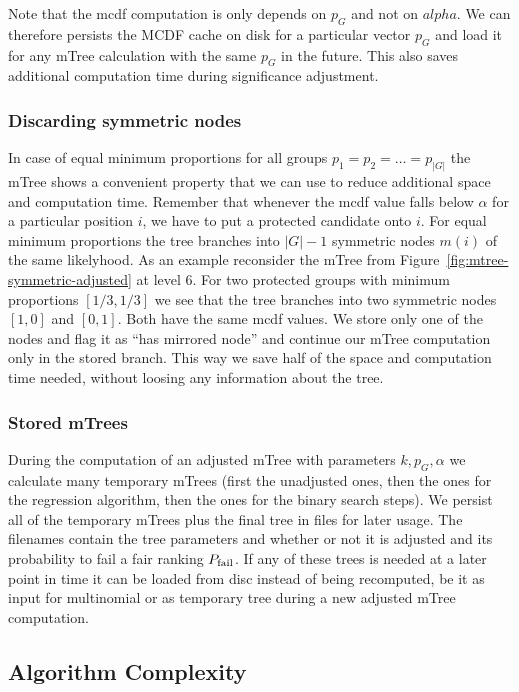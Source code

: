 Note that the mcdf computation is only depends on $p_G$ and not on $alpha$. 
%
We can therefore persists the MCDF cache on disk for a particular vector $p_G$ and load it for any mTree calculation with the same $p_G$ in the future.
%
This also saves additional computation time during significance adjustment.

\subsubsection{Discarding symmetric nodes}
\label{subsubsec:discarding-symmetric-nodes}
In case of equal minimum proportions for all groups $p_1 = p_2 = \ldots = p_|G|$ the mTree shows a convenient property that we can use to reduce additional space and computation time. 
%
Remember that whenever the mcdf value falls below $\alpha$ for a particular position $i$, we have to put a protected candidate onto $i$. 
%
For equal minimum proportions the tree branches into $|G| - 1$ symmetric nodes $m(i)$ of the same likelyhood.
%
As an example reconsider the mTree from Figure~\ref{fig:mtree-symmetric-adjusted} at level 6. 
%
For two protected groups with minimum proportions $[1/3, 1/3]$ we see that the tree branches into two symmetric nodes $[1, 0]$ and $[0,1]$. 
%
Both have the same mcdf values.
%
We store only one of the nodes and flag it as ``has mirrored node'' and continue our mTree computation only in the stored branch.
%
This way we save half of the space and computation time needed, without loosing any information about the tree. 

\subsubsection{Stored mTrees}
\label{subsubsec:stored-mtrees}
During the computation of an adjusted mTree with parameters $k,p_G , \alpha$ we calculate many temporary mTrees (first the unadjusted ones, then the ones for the regression algorithm, then the ones for the binary search steps).
%
We persist all of the temporary mTrees plus the final tree in files for later usage.
%
The filenames contain the tree parameters and whether or not it is adjusted and its probability to fail a fair ranking $P_{\operatorname{fail}}$.
%
If any of these trees is needed at a later point in time it can be loaded from disc instead of being recomputed, be it as input for multinomial \algoFAIR or as temporary tree during a new adjusted mTree computation.


\subsection{Algorithm Complexity}\label{subsec:algorithm-complexity}


